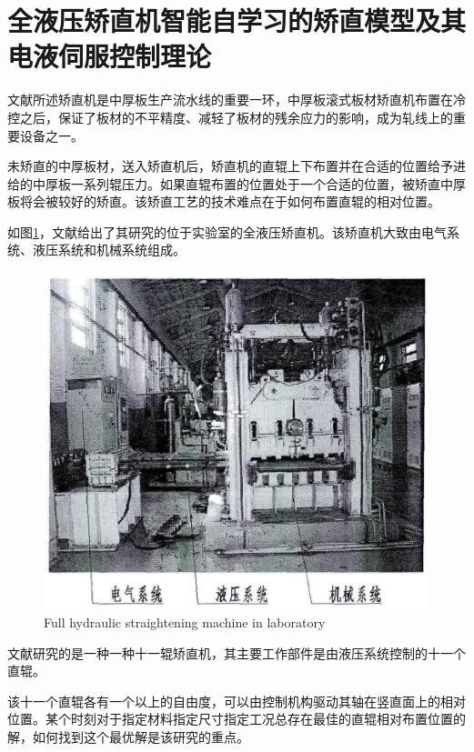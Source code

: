 \section{全液压矫直机智能自学习的矫直模型及其电液伺服控制理论}

文献\parencite{zhinengjiaozhiji}所述矫直机是中厚板生产流水线的重要一环，中厚板滚式板材矫直机布置在冷控之后，保证了板材的不平精度、减轻了板材的残余应力的影响，成为轧线上的重要设备之一。

未矫直的中厚板材，送入矫直机后，矫直机的直辊上下布置并在合适的位置给予进给的中厚板一系列辊压力。如果直辊布置的位置处于一个合适的位置，被矫直中厚板将会被较好的矫直。该矫直工艺的技术难点在于如何布置直辊的相对位置。

如图\ref{fig:jiaozhiji}，文献\parencite{zhinengjiaozhiji}给出了其研究的位于实验室的全液压矫直机。该矫直机大致由电气系统、液压系统和机械系统组成。

\begin{figure}[!htp]
	\centering
	\includegraphics[width=\textwidth]{IMG/jiaozhiji.png}
		{Full hydraulic straightening machine in laboratory}
	\label{fig:jiaozhiji}
\end{figure}

文献\parencite{zhinengjiaozhiji}研究的是一种一种十一辊矫直机，其主要工作部件是由液压系统控制的十一个直辊。

该十一个直辊各有一个以上的自由度，可以由控制机构驱动其轴在竖直面上的相对位置。某个时刻对于指定材料指定尺寸指定工况总存在最佳的直辊相对布置位置的解，如何找到这个最优解是该研究的重点。

